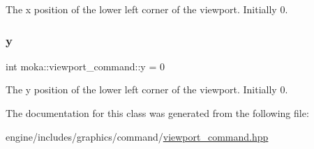 The x position of the lower left corner of the viewport. Initially 0. \mbox{\label{classmoka_1_1viewport__command_a7141660e90f1abb2f3ce40c9d42d91f2}} 
\subsubsection{\texorpdfstring{y}{y}}
{\footnotesize\ttfamily int moka\+::viewport\+\_\+command\+::y = 0}

The y position of the lower left corner of the viewport. Initially 0. 

The documentation for this class was generated from the following file\+:\begin{DoxyCompactItemize}
\item 
engine/includes/graphics/command/\mbox{\hyperlink{viewport__command_8hpp}{viewport\+\_\+command.\+hpp}}\end{DoxyCompactItemize}
